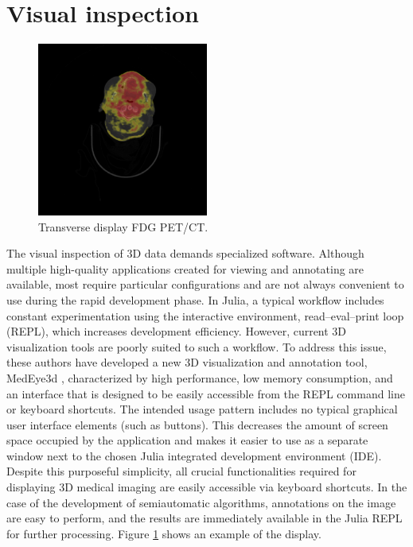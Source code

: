 \documentclass{juliacon}
\begin{document}
\section{Visual inspection}

\begin{figure}[t!]
	\centering
	\includegraphics[width=0.5\textwidth]{PETCTCORONAL.png}
	\caption{Transverse display FDG PET/CT.}
	\label{fig:PETCTCORONAL}
	\centering
\end{figure}

The visual inspection of 3D data demands specialized software. Although multiple high-quality applications created for viewing and annotating are available, most require particular configurations and are not always convenient to use during the rapid development phase. In Julia, a typical workflow includes constant experimentation using the interactive environment, read--eval--print loop (REPL), which increases development efficiency. However, current 3D visualization tools are poorly suited to such a workflow. To address this issue, these authors have developed a new 3D visualization and annotation tool, MedEye3d \cite{Mitura2021}, characterized by high performance, low memory consumption, and an interface that is designed to be easily accessible from the REPL command line or keyboard shortcuts. The intended usage pattern includes no typical graphical user interface elements (such as buttons). This decreases the amount of screen space occupied by the application and makes it easier to use  as a separate window next to the chosen Julia integrated development environment (IDE). Despite this purposeful simplicity, all crucial functionalities required for displaying 3D medical imaging are easily accessible via keyboard shortcuts. In the case of the development of semiautomatic algorithms, annotations on the image are easy to perform, and the results are immediately available in the Julia REPL for further processing. Figure \ref{fig:PETCTCORONAL} shows an example of the display.
\end{document}
